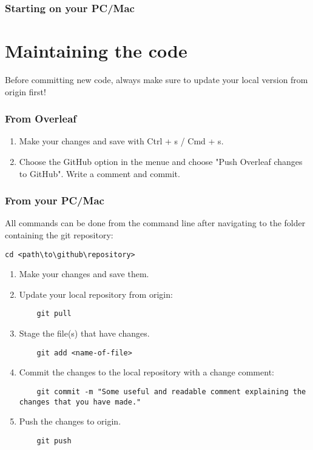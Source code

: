 \documentclass{article}
\begin{document}
\subsubsection{Starting on your PC/Mac}

\section{Maintaining the code}

Before committing new code, always make sure to update your local version from origin first!

\subsubsection{From Overleaf}

\begin{enumerate}
    \item Make your changes and save with Ctrl + s / Cmd + s.
    \item Choose the GitHub option in the menue and choose "Push Overleaf changes to GitHub". Write a comment and commit.
\end{enumerate}

\subsubsection{From your PC/Mac}
All commands can be done from the command line after navigating to the folder containing the git repository:
\begin{verbatim}
cd <path\to\github\repository>
\end{verbatim}

\begin{enumerate}
    \item Make your changes and save them.
    \item Update your local repository from origin:
	\begin{verbatim}
    git pull   
    \end{verbatim}
	\item Stage the file(s) that have changes.
	\begin{verbatim}
    git add <name-of-file>
    \end{verbatim}
	\item Commit the changes to the local repository with a change comment:
	\begin{verbatim}
    git commit -m "Some useful and readable comment explaining the changes that you have made."
    \end{verbatim}
	\item Push the changes to origin.
	\begin{verbatim}
    git push
    \end{verbatim}
\end{enumerate}
\end{document}
